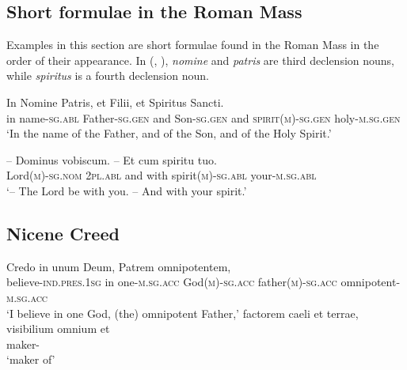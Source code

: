 \documentclass[a4paper, oneside, 12pt]{report}
\newcommand{\form}[1]{\emph{#1}}
\newcommand*{\category}[1]{\textsc{#1}}
\newcommand{\translate}[1]{`#1'}
\begin{document}
\subsection{Short formulae in the Roman Mass}

Examples in this section are short formulae found in the Roman Mass
in the order of their appearance.
In (, ),
\form{nomine} and \form{patris} are third declension nouns, 
while \form{spiritus} is a fourth declension noun. 

\begin{exe}
    \ex\label{ex:text.mass.1} \gll In Nomine Patris, et Filii, et Spiritus Sancti. \\
    in name-\category{sg}.\category{abl} Father-\category{sg}.\category{gen} 
    and Son-\category{sg}.\category{gen} 
    and \category{spirit}(\category{m})-\category{sg}.\category{gen}
    holy-\category{m}.\category{sg}.\category{gen} \\
    \glt \translate{In the name of the Father, and of the Son, and of the Holy Spirit.}

    \ex\label{ex:text.mass.2} \gll -- Dominus vobiscum. -- Et cum spiritu tuo. \\
    {} Lord(\category{m})-\category{sg}.\category{nom} 
    \category{2pl}.\category{abl} 
    {} and with spirit(\category{m})-\category{sg}.\category{abl} 
    your-\category{m}.\category{sg}.\category{abl} \\
    \glt \translate{-- The Lord be with you. -- And with your spirit.}
    
    \ex 
\end{exe}

\subsection{Nicene Creed}

\begin{exe}
    \ex \gll Credo in unum Deum, Patrem omnipotentem, \\
    believe-\category{ind}.\category{pres}.\category{1sg} in 
    one-\category{m}.\category{sg}.\category{acc} 
    God(\category{m})-\category{sg}.\category{acc} 
    father(\category{m})-\category{sg}.\category{acc}
    omnipotent-\category{m}.\category{sg}.\category{acc} \\
    \glt \translate{I believe in one God, (the) omnipotent Father,} 
    \ex \gll factorem caeli et terrae, visibilium omnium et \\ 
    maker- \\
    \glt \translate{maker of}
\end{exe}
\end{document}
